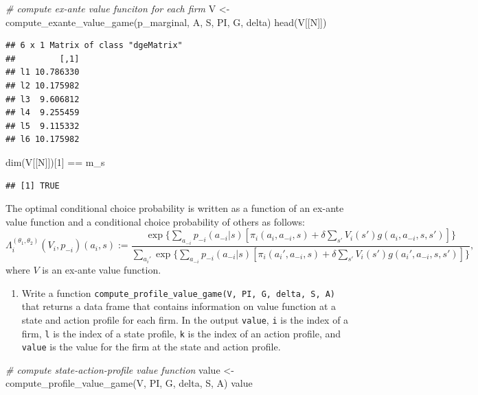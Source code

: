 \documentclass[
]{book}
\newenvironment{Shaded}{\begin{snugshade}}{\end{snugshade}}
\newcommand{\CommentTok}[1]{\textcolor[rgb]{0.56,0.35,0.01}{\textit{#1}}}
\newcommand{\DecValTok}[1]{\textcolor[rgb]{0.00,0.00,0.81}{#1}}
\newcommand{\FunctionTok}[1]{\textcolor[rgb]{0.00,0.00,0.00}{#1}}
\newcommand{\NormalTok}[1]{#1}
\newcommand{\OtherTok}[1]{\textcolor[rgb]{0.56,0.35,0.01}{#1}}
\newcommand{\SpecialCharTok}[1]{\textcolor[rgb]{0.00,0.00,0.00}{#1}}
\providecommand{\tightlist}{%
  \setlength{\itemsep}{0pt}\setlength{\parskip}{0pt}}
\begin{document}
\begin{Shaded}
\begin{Highlighting}[]
\CommentTok{\# compute ex{-}ante value funciton for each firm}
\NormalTok{V }\OtherTok{\textless{}{-}} \FunctionTok{compute\_exante\_value\_game}\NormalTok{(p\_marginal, A, S, PI, G, delta)}
\FunctionTok{head}\NormalTok{(V[[N]])}
\end{Highlighting}
\end{Shaded}

\begin{verbatim}
## 6 x 1 Matrix of class "dgeMatrix"
##         [,1]
## l1 10.786330
## l2 10.175982
## l3  9.606812
## l4  9.255459
## l5  9.115332
## l6 10.175982
\end{verbatim}

\begin{Shaded}
\begin{Highlighting}[]
\FunctionTok{dim}\NormalTok{(V[[N]])[}\DecValTok{1}\NormalTok{] }\SpecialCharTok{==}\NormalTok{ m\_s}
\end{Highlighting}
\end{Shaded}

\begin{verbatim}
## [1] TRUE
\end{verbatim}

The optimal conditional choice probability is written as a function of an ex-ante value function and a conditional choice probability of others as follows:
\[
\Lambda_i^{(\theta_1, \theta_2)}(V_i, p_{-i})(a_i, s) := \frac{\exp\{\sum_{a_{-i}}p_{-i}(a_{-i}|s)[\pi_i(a_i, a_{-i}, s) + \delta \sum_{s'}V_i(s')g(a_i, a_{-i}, s, s')]\}}{\sum_{a_i'}\exp\{\sum_{a_{-i}}p_{-i}(a_{-i}|s)[\pi_i(a_i', a_{-i}, s) + \delta \sum_{s'}V_i(s')g(a_i', a_{-i}, s, s')]\}},
\]
where \(V\) is an ex-ante value function.

\begin{enumerate}
\def\labelenumi{\arabic{enumi}.}
\setcounter{enumi}{7}
\tightlist
\item
  Write a function \texttt{compute\_profile\_value\_game(V,\ PI,\ G,\ delta,\ S,\ A)} that returns a data frame that contains information on value function at a state and action profile for each firm. In the output \texttt{value}, \texttt{i} is the index of a firm, \texttt{l} is the index of a state profile, \texttt{k} is the index of an action profile, and \texttt{value} is the value for the firm at the state and action profile.
\end{enumerate}

\begin{Shaded}
\begin{Highlighting}[]
\CommentTok{\# compute state{-}action{-}profile value function}
\NormalTok{value }\OtherTok{\textless{}{-}} \FunctionTok{compute\_profile\_value\_game}\NormalTok{(V, PI, G, delta, S, A)}
\NormalTok{value}
\end{Highlighting}
\end{Shaded}
\end{document}

